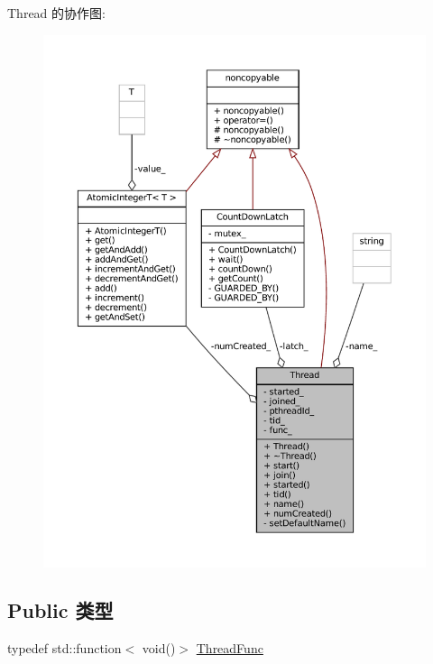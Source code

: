 Thread 的协作图\+:
\nopagebreak
\begin{figure}[H]
\begin{center}
\leavevmode
\includegraphics[width=350pt]{classmuduo_1_1Thread__coll__graph}
\end{center}
\end{figure}
\subsection*{Public 类型}
\begin{DoxyCompactItemize}
\item 
typedef std\+::function$<$ void()$>$ \hyperlink{classmuduo_1_1Thread_a72bd31ac00c06074792e7cff0c8e3022}{Thread\+Func}
\end{DoxyCompactItemize}
